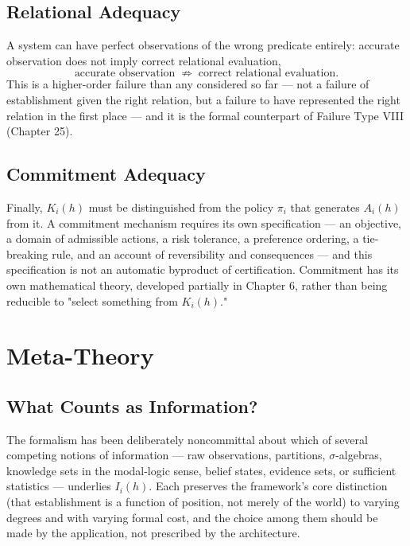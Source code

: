 \documentclass[11pt]{report}
\theoremstyle{definition}
\theoremstyle{plain}
\begin{document}
\chapter{Relational Adequacy}

A system can have perfect observations of the wrong predicate entirely: accurate observation does not imply correct relational evaluation,
\[
\text{accurate observation} \;\not\Rightarrow\; \text{correct relational evaluation}.
\]
This is a higher-order failure than any considered so far --- not a failure of establishment given the right relation, but a failure to have represented the right relation in the first place --- and it is the formal counterpart of Failure Type VIII (Chapter 25).

\chapter{Commitment Adequacy}

Finally, $K_i(h)$ must be distinguished from the policy $\pi_i$ that generates $A_i(h)$ from it. A commitment mechanism requires its own specification --- an objective, a domain of admissible actions, a risk tolerance, a preference ordering, a tie-breaking rule, and an account of reversibility and consequences --- and this specification is not an automatic byproduct of certification. Commitment has its own mathematical theory, developed partially in Chapter 6, rather than being reducible to "select something from $K_i(h)$."

\part{Meta-Theory}

\chapter{What Counts as Information?}

The formalism has been deliberately noncommittal about which of several competing notions of information --- raw observations, partitions, $\sigma$-algebras, knowledge sets in the modal-logic sense, belief states, evidence sets, or sufficient statistics --- underlies $I_i(h)$. Each preserves the framework's core distinction (that establishment is a function of position, not merely of the world) to varying degrees and with varying formal cost, and the choice among them should be made by the application, not prescribed by the architecture.
\end{document}
